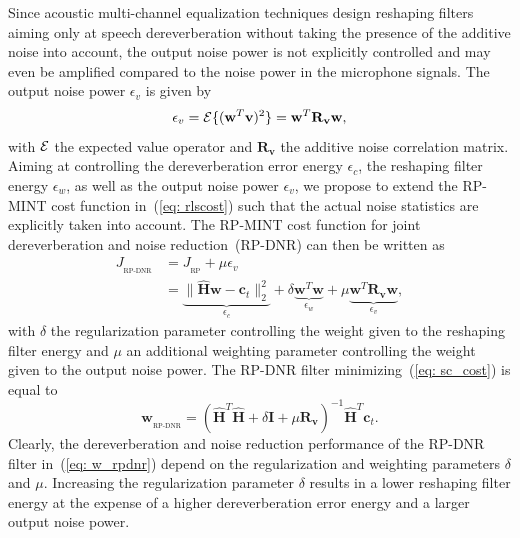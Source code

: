 \documentclass{aes60i}
\begin{document}
Since acoustic multi-channel equalization techniques design reshaping filters aiming only at speech dereverberation without taking the presence of the additive noise into account, the output noise power is not explicitly controlled and may even be amplified compared to the noise power in the microphone signals.
The output noise power $\epsilon_v$ is given by
\begin{equation}
\label{eq: np}
\epsilon_v = {\cal{E}} \{(\mathbf{w}^T \mathbf{v})^2 \} = \mathbf{w}^T \mathbf{R}_{\mathbf{v}}\mathbf{w},
\end{equation}
with ${\cal{E}}$ the expected value operator and $\mathbf{R}_{\mathbf{v}}$ the additive noise correlation matrix.
\newline
Aiming at controlling the dereverberation error energy $\epsilon_{c}$, the reshaping filter energy $\epsilon_{w}$, as well as the output noise power $\epsilon_v$, we propose to extend the RP-MINT cost function in~(\ref{eq: rlscost}) such that the actual noise statistics are explicitly taken into account.
The RP-MINT cost function for joint dereverberation and noise reduction~(RP-DNR) can then be written as 
\begin{align}
J_{_{\text{RP-DNR}}}  & = J_{_{\text{RP}}} + \mu \epsilon_{v} \\
\label{eq: sc_cost}
  & = \underbrace{\|\hat{\mathbf{H}}\mathbf{w} - \mathbf{c}_t \|_2^2}_{\epsilon_c} + \delta \underbrace{\mathbf{w}^T\mathbf{w}}_{\epsilon_w} + \mu \underbrace{\mathbf{w}^T \mathbf{R}_{\mathbf{v}}\mathbf{w}}_{\epsilon_v},
\end{align}
with $\delta$ the regularization parameter controlling the weight given to the reshaping filter energy and $\mu$ an additional weighting parameter controlling the weight given to the output noise power.
The RP-DNR filter minimizing~(\ref{eq: sc_cost}) is equal to
\begin{equation}
\label{eq: w_rpdnr}
\mathbf{w}_{_{\text{RP-DNR}}} = (\hat{\mathbf{H}}^T\hat{\mathbf{H}} + \delta\mathbf{I}+ \mu \mathbf{R}_{\mathbf{v}})^{-1}\hat{\mathbf{H}}^T\mathbf{c}_t.
\end{equation}
Clearly, the dereverberation and noise reduction performance of the RP-DNR filter in~(\ref{eq: w_rpdnr}) depend on the regularization and weighting parameters $\delta$ and $\mu$.
Increasing the regularization parameter $\delta$ results in a lower reshaping filter energy at the expense of a higher dereverberation error energy and a larger output noise power.
\end{document}
